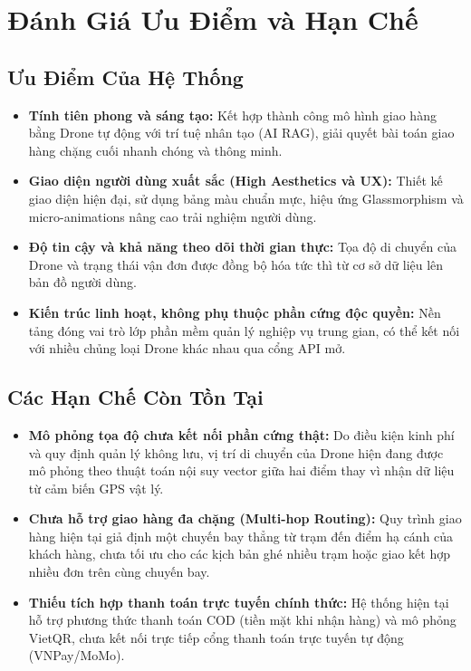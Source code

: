 \section{Đánh Giá Ưu Điểm và Hạn Chế}

\subsection{Ưu Điểm Của Hệ Thống}

\begin{itemize}[leftmargin=*]
  \item \textbf{Tính tiên phong và sáng tạo:} Kết hợp thành công mô hình giao hàng bằng Drone tự động với trí tuệ nhân tạo (AI RAG), giải quyết bài toán giao hàng chặng cuối nhanh chóng và thông minh.
  \item \textbf{Giao diện người dùng xuất sắc (High Aesthetics và UX):} Thiết kế giao diện hiện đại, sử dụng bảng màu chuẩn mực, hiệu ứng Glassmorphism và micro-animations nâng cao trải nghiệm người dùng.
  \item \textbf{Độ tin cậy và khả năng theo dõi thời gian thực:} Tọa độ di chuyển của Drone và trạng thái vận đơn được đồng bộ hóa tức thì từ cơ sở dữ liệu lên bản đồ người dùng.
  \item \textbf{Kiến trúc linh hoạt, không phụ thuộc phần cứng độc quyền:} Nền tảng đóng vai trò lớp phần mềm quản lý nghiệp vụ trung gian, có thể kết nối với nhiều chủng loại Drone khác nhau qua cổng API mở.
\end{itemize}

\subsection{Các Hạn Chế Còn Tồn Tại}

\begin{itemize}[leftmargin=*]
  \item \textbf{Mô phỏng tọa độ chưa kết nối phần cứng thật:} Do điều kiện kinh phí và quy định quản lý không lưu, vị trí di chuyển của Drone hiện đang được mô phỏng theo thuật toán nội suy vector giữa hai điểm thay vì nhận dữ liệu từ cảm biến GPS vật lý.
  \item \textbf{Chưa hỗ trợ giao hàng đa chặng (Multi-hop Routing):} Quy trình giao hàng hiện tại giả định một chuyến bay thẳng từ trạm đến điểm hạ cánh của khách hàng, chưa tối ưu cho các kịch bản ghé nhiều trạm hoặc giao kết hợp nhiều đơn trên cùng chuyến bay.
  \item \textbf{Thiếu tích hợp thanh toán trực tuyến chính thức:} Hệ thống hiện tại hỗ trợ phương thức thanh toán COD (tiền mặt khi nhận hàng) và mô phỏng VietQR, chưa kết nối trực tiếp cổng thanh toán trực tuyến tự động (VNPay/MoMo).
\end{itemize}

